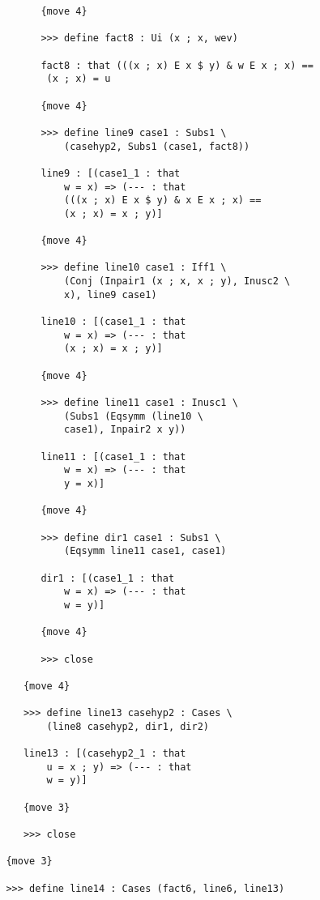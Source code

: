 \documentclass[12pt]{article}
\begin{document}
\begin{verbatim}
               {move 4}

               >>> define fact8 : Ui (x ; x, wev)

               fact8 : that (((x ; x) E x $ y) & w E x ; x) == 
                (x ; x) = u

               {move 4}

               >>> define line9 case1 : Subs1 \
                   (casehyp2, Subs1 (case1, fact8))

               line9 : [(case1_1 : that 
                   w = x) => (--- : that 
                   (((x ; x) E x $ y) & x E x ; x) == 
                   (x ; x) = x ; y)]

               {move 4}

               >>> define line10 case1 : Iff1 \
                   (Conj (Inpair1 (x ; x, x ; y), Inusc2 \
                   x), line9 case1)

               line10 : [(case1_1 : that 
                   w = x) => (--- : that 
                   (x ; x) = x ; y)]

               {move 4}

               >>> define line11 case1 : Inusc1 \
                   (Subs1 (Eqsymm (line10 \
                   case1), Inpair2 x y))

               line11 : [(case1_1 : that 
                   w = x) => (--- : that 
                   y = x)]

               {move 4}

               >>> define dir1 case1 : Subs1 \
                   (Eqsymm line11 case1, case1)

               dir1 : [(case1_1 : that 
                   w = x) => (--- : that 
                   w = y)]

               {move 4}

               >>> close

            {move 4}

            >>> define line13 casehyp2 : Cases \
                (line8 casehyp2, dir1, dir2)

            line13 : [(casehyp2_1 : that 
                u = x ; y) => (--- : that 
                w = y)]

            {move 3}

            >>> close

         {move 3}

         >>> define line14 : Cases (fact6, line6, line13)


\end{verbatim}
\end{document}
